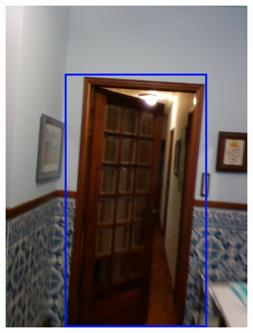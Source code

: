 \begin{figure}[h!]
\begin{subfigure}[b]{0.32\linewidth}
		\includegraphics[width=\linewidth]{images/deep_doors_2_semiopen.png}
		\caption{}
	\end{subfigure}
	\hfil
	\begin{subfigure}[b]{0.32\linewidth}

\end{subfigure}
\end{figure}
